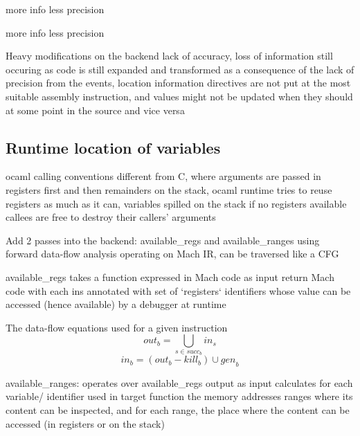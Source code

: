 \begin{description}
\pro more info
\con less precision
\end{description}

\begin{itemize}
\tick more info
\fail less precision
\end{itemize}

Heavy modifications on the backend
lack of accuracy, loss of information still occuring as code is still expanded and transformed
as a consequence of the lack of precision from the events,
location information directives are not put at the
most suitable assembly instruction, and values might not be updated when they should
at some point in the source
and vice versa

\subsection{Runtime location of variables}

ocaml calling conventions different from C, where arguments are passed in
registers first and then remainders on the stack, ocaml runtime tries to reuse registers as much as it can, variables
spilled on the stack if no registers available
callees are free to destroy their callers' arguments

Add 2 passes into the backend: available\_regs and available\_ranges
using forward data-flow analysis operating on Mach IR, can be traversed like
a CFG


available\_regs
takes a function expressed in Mach code as input
return Mach code with each ins annotated with set of `registers` identifiers
whose value can be accessed (hence available) by a debugger at runtime

The data-flow equations used for a given instruction
\[
    \textit{out}_{b} = \bigcup_{s \in succ_{b}} \textit{in}_{s}
\]
\[
    \textit{in}_{b} = (\textit{out}_{b} - \textit{kill}_{b}) \cup \textit{gen}_{b}
\]

available\_ranges:
operates over available\_regs output as input
calculates for each variable/ identifier used in target function the memory
addresses ranges where its content can be inspected, and for each range, the
place where the content can be accessed (in registers or on the stack)

